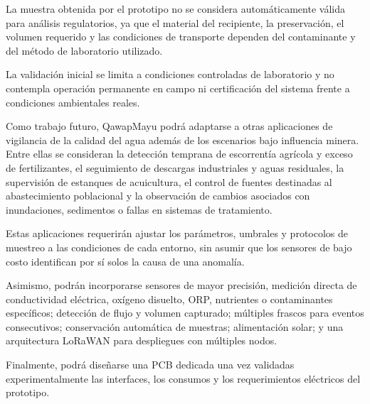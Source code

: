 \documentclass[11pt,a4paper]{article}
\begin{document}
La muestra obtenida por el prototipo no se considera automáticamente válida para análisis regulatorios, ya que el material del recipiente, la preservación, el volumen requerido y las condiciones de transporte dependen del contaminante y del método de laboratorio utilizado.

La validación inicial se limita a condiciones controladas de laboratorio y no contempla operación permanente en campo ni certificación del sistema frente a condiciones ambientales reales.

Como trabajo futuro, QawapMayu podrá adaptarse a otras aplicaciones de vigilancia de la calidad del agua además de los escenarios bajo influencia minera. Entre ellas se consideran la detección temprana de escorrentía agrícola y exceso de fertilizantes, el seguimiento de descargas industriales y aguas residuales, la supervisión de estanques de acuicultura, el control de fuentes destinadas al abastecimiento poblacional y la observación de cambios asociados con inundaciones, sedimentos o fallas en sistemas de tratamiento.

Estas aplicaciones requerirán ajustar los parámetros, umbrales y protocolos de muestreo a las condiciones de cada entorno, sin asumir que los sensores de bajo costo identifican por sí solos la causa de una anomalía.

Asimismo, podrán incorporarse sensores de mayor precisión, medición directa de conductividad eléctrica, oxígeno disuelto, ORP, nutrientes o contaminantes específicos; detección de flujo y volumen capturado; múltiples frascos para eventos consecutivos; conservación automática de muestras; alimentación solar; y una arquitectura LoRaWAN para despliegues con múltiples nodos.

Finalmente, podrá diseñarse una PCB dedicada una vez validadas experimentalmente las interfaces, los consumos y los requerimientos eléctricos del prototipo.
\end{document}
